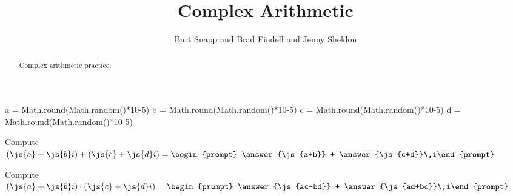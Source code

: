 \documentclass[nooutcomes]{ximera}
\title{Complex Arithmetic}
\author{Bart Snapp and Brad Findell and Jenny Sheldon}
\begin{document}
\begin{abstract}
Complex arithmetic practice.
\end{abstract}
\maketitle





\begin{javascript}
  a = Math.round(Math.random()*10-5)
  b = Math.round(Math.random()*10-5)
  c = Math.round(Math.random()*10-5)
  d = Math.round(Math.random()*10-5)
\end{javascript}

\begin{problem}
Compute $(\js{a}+\js{b}i)+(\js{c}+\js{d}i) = \begin{prompt} \answer{\js{a+b}} + \answer{\js{c+d}}\,i\end{prompt}$
\end{problem}

\begin{problem}
Compute $(\js{a}+\js{b}i)\cdot(\js{c}+\js{d}i) = \begin{prompt} \answer{\js{ac-bd}} + \answer{\js{ad+bc}}\,i\end{prompt}$
\end{problem}
\end{document}
